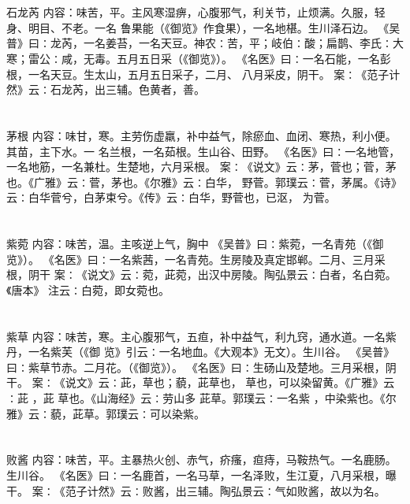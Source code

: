 \documentclass[12pt,UTF8]{ctexbook}
\begin{document}
\section{}石龙芮
内容：味苦，平。主风寒湿痹，心腹邪气，利关节，止烦满。久服，轻身、明目、不老。一名 
鲁果能（《御览》作食果），一名地椹。生川泽石边。 
《吴普》曰∶龙芮，一名姜苔，一名天豆。神农∶苦，平；岐伯∶酸；扁鹊、李氏∶大 
寒；雷公∶咸，无毒。五月五日采（《御览》）。 
《名医》曰∶一名石能，一名彭根，一名天豆。生太山，五月五日采子，二月、 
八月采皮，阴干。 
案∶《范子计然》云∶石龙芮，出三辅。色黄者，善。 


\section{}茅根
内容：味甘，寒。主劳伤虚羸，补中益气，除瘀血、血闭、寒热，利小便。其苗，主下水。一 
名兰根，一名茹根。生山谷、田野。 
《名医》曰∶一名地管，一名地筋，一名兼杜。生楚地，六月采根。 
案∶《说文》云∶茅，菅也；菅，茅也。《广雅》云∶菅，茅也。《尔雅》云∶白华， 
野菅。郭璞云∶菅，茅属。《诗》云∶白华菅兮，白茅束兮。《传》云∶白华，野菅也，已沤， 
为菅。 


\section{}紫菀
内容：味苦，温。主咳逆上气，胸中 
《吴普》曰∶紫菀，一名青苑（《御览》）。 
《名医》曰∶一名紫茜，一名青苑。生房陵及真定邯郸。二月、三月采根，阴干 
案∶《说文》云∶菀，茈菀，出汉中房陵。陶弘景云∶白者，名白菀。《唐本》 
注云∶白菀，即女菀也。 


\section{}紫草
内容：味苦，寒。主心腹邪气，五疸，补中益气，利九窍，通水道。一名紫丹，一名紫芙（《御 
览》引云∶一名地血。《大观本》无文）。生川谷。 
《吴普》曰∶紫草节赤。二月花。（《御览》）。 
《名医》曰∶生砀山及楚地。三月采根，阴干。 
案∶《说文》云∶茈，草也；藐，茈草也， 草也，可以染留黄。《广雅》云∶茈 ，茈 
草也。《山海经》云∶劳山多 
茈草。郭璞云∶一名紫 ，中染紫也。《尔雅》云∶藐，茈草。郭璞云∶可以染紫。 


\section{}败酱
内容：味苦，平。主暴热火创、赤气，疥瘙，疸痔，马鞍热气。一名鹿肠。生川谷。 
《名医》曰∶一名鹿首，一名马草，一名泽败，生江夏，八月采根，曝干。 
案∶《范子计然》云∶败酱，出三辅。陶弘景云∶气如败酱，故以为名。 
\end{document}

